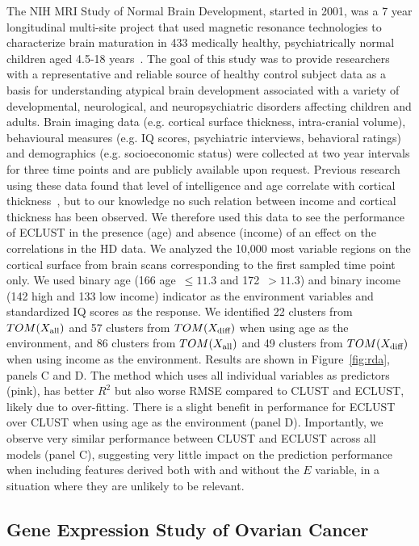 The NIH MRI Study of Normal Brain Development, started in 2001, was a 7 year longitudinal multi-site project that used magnetic resonance technologies to characterize brain maturation in 433 medically healthy, psychiatrically normal children aged 4.5-18 years~\citep{evans2006nih}. The goal of this study was to provide researchers with a representative and reliable source of healthy control subject data as a basis for understanding atypical brain development associated with a variety of developmental, neurological, and neuropsychiatric disorders affecting children and adults. Brain imaging data (e.g. cortical surface thickness, intra-cranial volume), behavioural measures (e.g. IQ scores, psychiatric interviews, behavioral ratings) and demographics (e.g. socioeconomic status) were collected at two year intervals for three time points and are publicly available upon request. Previous research using these data found that level of intelligence and age correlate with cortical thickness~\citep{shaw2006intellectual, khundrakpam2013developmental}, but to our knowledge no such relation between income and cortical thickness has been observed. We therefore used this data to see the performance of ECLUST in the presence (age) and absence (income) of an effect on the correlations in the HD data. We analyzed the 10,000 most variable regions on the cortical surface from brain scans corresponding to the first sampled time point only. We used binary age (166 age~$\leq 11.3$ and 172~$>11.3$) and binary income (142 high and 133 low income) indicator as the environment variables and standardized IQ scores as the response. We identified 22 clusters from $TOM(X_{\textrm{{all}}})$ and 57 clusters from $TOM(X_{\textrm{{diff}}})$ when using age as the environment, and 86 clusters from $TOM(X_{\textrm{{all}}})$ and 49 clusters from $TOM(X_{\textrm{{diff}}})$ when using income as the environment. Results are shown in Figure~\ref{fig:rda}, panels C and D. The method which uses all individual variables as predictors (pink), has better $R^2$ but also worse RMSE compared to CLUST and ECLUST, likely due to over-fitting. There is a slight benefit in performance for ECLUST over CLUST when using age as the environment (panel D). Importantly, we observe very similar performance between CLUST and ECLUST across all models (panel C), suggesting very little impact on the prediction performance when including features derived both with and without the $E$ variable, in a situation where they are unlikely to be relevant. 


\subsection{Gene Expression Study of Ovarian Cancer}

